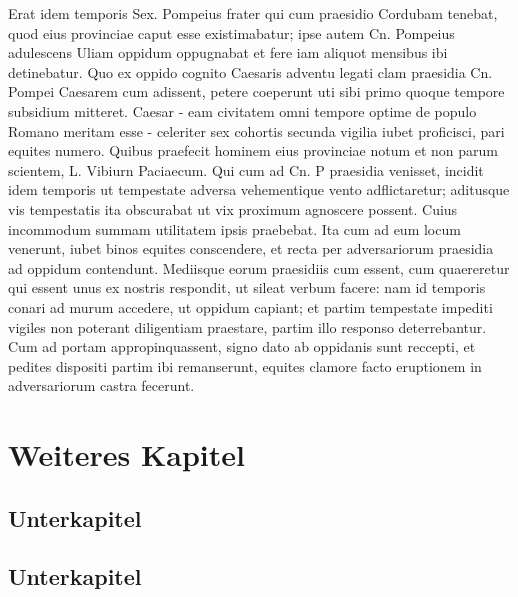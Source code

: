 Erat idem temporis Sex. Pompeius frater qui cum praesidio Cordubam
tenebat, quod eius provinciae caput esse existimabatur; ipse autem
Cn. Pompeius adulescens Uliam oppidum oppugnabat et fere iam
aliquot mensibus ibi detinebatur. Quo ex oppido cognito Caesaris
adventu legati clam praesidia Cn. Pompei Caesarem cum adissent,
petere coeperunt uti sibi primo quoque tempore subsidium mitteret.
Caesar - eam civitatem omni tempore optime de populo Romano
meritam esse - celeriter sex cohortis secunda vigilia iubet
proficisci, pari equites numero. Quibus praefecit hominem eius
provinciae notum et non parum scientem, L. Vibiurn Paciaecum. Qui
cum ad Cn. P praesidia venisset, incidit idem temporis ut
tempestate adversa vehementique vento adflictaretur; aditusque vis
tempestatis ita obscurabat ut vix proximum agnoscere possent.
Cuius incommodum summam utilitatem ipsis praebebat. Ita cum ad eum
locum venerunt, iubet binos equites conscendere, et recta per
adversariorum praesidia ad oppidum contendunt. Mediisque eorum
praesidiis cum essent, cum quaereretur qui essent unus ex nostris
respondit, ut sileat verbum facere: nam id temporis conari ad
murum accedere, ut oppidum capiant; et partim tempestate impediti
vigiles non poterant diligentiam praestare, partim illo responso
deterrebantur. Cum ad portam appropinquassent, signo dato ab
oppidanis sunt reccepti, et pedites dispositi partim ibi
remanserunt, equites clamore facto eruptionem in adversariorum
castra fecerunt.

\pagebreak
\section{Weiteres Kapitel}\raggedbottom 
\subsection{Unterkapitel}
\subsection{Unterkapitel}